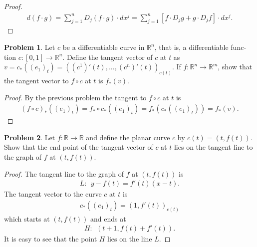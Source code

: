 \documentclass[20pt]{article}
\theoremstyle{plain}
\theoremstyle{definition}
\newtheorem*{problem}{Problem}
\newcommand{\reals}{\mathbb{R}}
\begin{document}
\begin{proof}
  \begin{align*}
    d(f \cdot g) =
    \sum_{j=1}^n D_j(f \cdot g) \cdot dx^j =
    \sum_{j=1}^n [f \cdot D_jg + g \cdot  D_jf] \cdot dx^j.
  \end{align*}
\end{proof}



\begin{problem}{4.14}
  Let $c$ be a differentiable curve in $\reals^n$, that is, a differentiable func­tion
  $c: [0,1] \to \reals^n$. Define the tangent vector of $c$ at $t$ as
  $v = c_*((e_1)_t) = ((c^1)'(t), ..., (c^n)'(t))_{c(t)}$.
  If $f: \reals^n \to \reals^m$, show that the tangent vector to $f \circ c$ at $t$ is $f_*(v)$.
\end{problem}

\begin{proof}
  By the previous problem the tangent to $f \circ c$ at $t$ is
  \begin{align}
    (f \circ c)_*((e_1)_t) = f_* \circ c_*((e_1)_t) = f_*(c_*((e_1)_t)) = f_*(v).
  \end{align}
\end{proof}



\begin{problem}{4.15}
  Let $f: \reals \to \reals$ and define the planar curve $c$ by $c(t) = (t, f(t))$.
  Show that the end point of the tangent vector of $c$ at $t$ lies on the
  tangent line to the graph of $f$ at $(t,f(t))$.
\end{problem}

\begin{proof}
  The tangent line to the graph of $f$ at $(t, f(t))$ is
  \begin{align*}
    L:\ \ y - f(t) = f'(t)(x - t).
  \end{align*}
  The tangent vector to the curve $c$ at $t$ is
  \begin{align*}
    c_*((e_1)_t) = (1, f'(t))_{c(t)}
  \end{align*}
  which starts at $(t, f(t))$ and ends at
  \begin{align*}
    H: \ \ (t+1, f(t) + f'(t)).
  \end{align*}
  It is easy to see that the point $H$ lies on the line $L$.
\end{proof}
\end{document}
